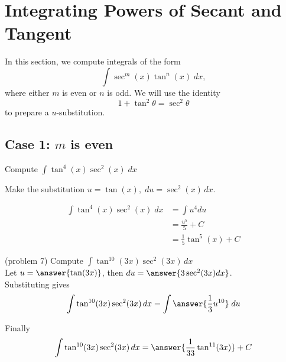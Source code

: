 \documentclass[handout]{ximera}
\begin{document}



\section{Integrating Powers of Secant and Tangent}
In this section, we compute integrals of the form
\[
\int \sec^m(x)\tan^n(x) \; dx,
\]
where either $m$ is even or $n$ is odd. We will use the identity
\[
1+\tan^2 \theta = \sec^2 \theta
\]
to prepare a $u$-substitution.


\subsection{Case 1: $m$ is even}
\begin{example}[example 7]
Compute $\displaystyle{\int \tan^4(x) \sec^2(x)\;dx}$

Make the substitution $u = \tan(x), \; du = \sec^2(x) \, dx$.

\begin{align*}
\int \tan^4(x) \sec^2(x)\;dx &= \int u^4 du\\
&=  \frac{u^5}{5} + C  \\
&= \frac15\tan^5(x)  + C
\end{align*}
\end{example} 




\begin{problem}(problem 7)
Compute $\displaystyle{\int \tan^{10}(3x)\sec^2(3x) \, dx}$\\

Let $u = \answer{\tan(3x)}$, \; then $du = \answer{3\sec^2(3x) dx}$.\\

Substituting gives 
\[
\int \tan^{10}(3x)\sec^2(3x) \, dx = \int \answer{\frac13 u^{10}} \; du
\]

Finally
\[
\int \tan^{10}(3x)\sec^2(3x) \, dx = \answer{\frac{1}{33} \tan^{11}(3x)} + C
\]

\end{problem}
\end{document}
